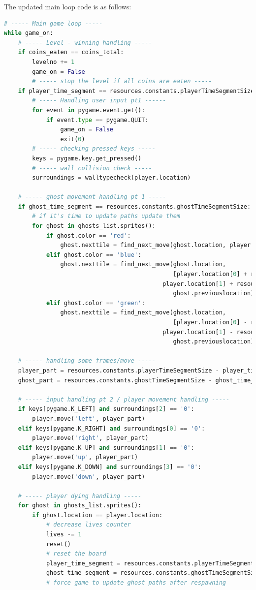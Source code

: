 \documentclass[11pt,a4paper,notitlepage]{report}
\begin{document}
				The updated main loop code is as follows:
				\begin{lstlisting}[language=Python]
# ----- Main game loop -----
while game_on:
	# ----- Level - winning handling -----
	if coins_eaten == coins_total:
		levelno += 1
		game_on = False
		# ----- stop the level if all coins are eaten -----
	if player_time_segment == resources.constants.playerTimeSegmentSize:
		# ----- Handling user input pt1 ------
		for event in pygame.event.get():
			if event.type == pygame.QUIT:
				game_on = False
				exit(0)
		# ----- checking pressed keys -----
		keys = pygame.key.get_pressed()
		# ----- wall collision check -----
		surroundings = walltypecheck(player.location)

	# ----- ghost movement handling pt 1 -----
	if ghost_time_segment == resources.constants.ghostTimeSegmentSize:
		# if it's time to update paths update them
		for ghost in ghosts_list.sprites():
			if ghost.color == 'red':
				ghost.nexttile = find_next_move(ghost.location, player.location, ghost.previouslocation)
			elif ghost.color == 'blue':
				ghost.nexttile = find_next_move(ghost.location,
												[player.location[0] + resources.constants.scatterSize,
											 player.location[1] + resources.constants.scatterSize],
												ghost.previouslocation)
			elif ghost.color == 'green':
				ghost.nexttile = find_next_move(ghost.location,
												[player.location[0] - resources.constants.scatterSize,
											 player.location[1] - resources.constants.scatterSize],
												ghost.previouslocation)

	# ----- handling some frames/move -----
	player_part = resources.constants.playerTimeSegmentSize - player_time_segment
	ghost_part = resources.constants.ghostTimeSegmentSize - ghost_time_segment

	# ----- input handling pt 2 / player movement handling -----
	if keys[pygame.K_LEFT] and surroundings[2] == '0':
		player.move('left', player_part)
	elif keys[pygame.K_RIGHT] and surroundings[0] == '0':
		player.move('right', player_part)
	elif keys[pygame.K_UP] and surroundings[1] == '0':
		player.move('up', player_part)
	elif keys[pygame.K_DOWN] and surroundings[3] == '0':
		player.move('down', player_part)

	# ----- player dying handling -----
	for ghost in ghosts_list.sprites():
		if ghost.location == player.location:
			# decrease lives counter
			lives -= 1
			reset()
			# reset the board
			player_time_segment = resources.constants.playerTimeSegmentSize + 1
			ghost_time_segment = resources.constants.ghostTimeSegmentSize + 1
			# force game to update ghost paths after respawning


\end{lstlisting}
\end{document}
